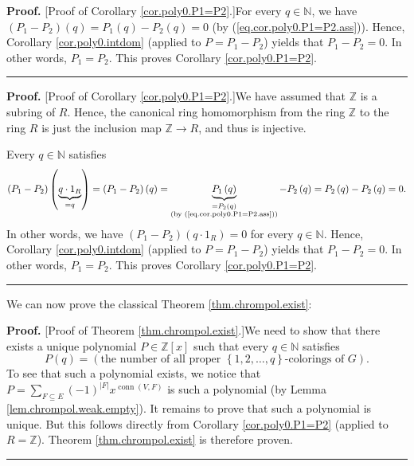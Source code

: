\documentclass[numbers=enddot,12pt,final,onecolumn,notitlepage]{scrartcl}%
\theoremstyle{definition}
\newenvironment{proof}[1][Proof]{\noindent\textbf{#1.} }{\ \rule{0.5em}{0.5em}}
\newenvironment{verlong}{}{}
\newenvironment{vershort}{}{}
\let\sumnonlimits\sum
\renewcommand{\sum}{\sumnonlimits\limits}
\begin{document}
\begin{vershort}
\begin{proof}
[Proof of Corollary \ref{cor.poly0.P1=P2}.]For every $q\in\mathbb{N}$, we have
$\left(  P_{1}-P_{2}\right)  \left(  q\right)  =P_{1}\left(  q\right)
-P_{2}\left(  q\right)  =0$ (by (\ref{eq.cor.poly0.P1=P2.ass})). Hence,
Corollary \ref{cor.poly0.intdom} (applied to $P=P_{1}-P_{2}$) yields that
$P_{1}-P_{2}=0$. In other words, $P_{1}=P_{2}$. This proves Corollary
\ref{cor.poly0.P1=P2}.
\end{proof}
\end{vershort}

\begin{verlong}
\begin{proof}
[Proof of Corollary \ref{cor.poly0.P1=P2}.]We have assumed that $\mathbb{Z}$
is a subring of $R$. Hence, the canonical ring homomorphism from the ring
$\mathbb{Z}$ to the ring $R$ is just the inclusion map $\mathbb{Z}\rightarrow
R$, and thus is injective.

Every $q\in\mathbb{N}$ satisfies
\[
\left(  P_{1}-P_{2}\right)  \left(  \underbrace{q\cdot1_{R}}_{=q}\right)
=\left(  P_{1}-P_{2}\right)  \left(  q\right)  =\underbrace{P_{1}\left(
q\right)  }_{\substack{=P_{2}\left(  q\right)  \\\text{(by
(\ref{eq.cor.poly0.P1=P2.ass}))}}}-P_{2}\left(  q\right)  =P_{2}\left(
q\right)  -P_{2}\left(  q\right)  =0.
\]
In other words, we have $\left(  P_{1}-P_{2}\right)  \left(  q\cdot
1_{R}\right)  =0$ for every $q\in\mathbb{N}$. Hence, Corollary
\ref{cor.poly0.intdom} (applied to $P=P_{1}-P_{2}$) yields that $P_{1}%
-P_{2}=0$. In other words, $P_{1}=P_{2}$. This proves Corollary
\ref{cor.poly0.P1=P2}.
\end{proof}
\end{verlong}

We can now prove the classical Theorem \ref{thm.chrompol.exist}:

\begin{vershort}
\begin{proof}
[Proof of Theorem \ref{thm.chrompol.exist}.]We need to show that there exists
a unique polynomial $P\in\mathbb{Z}\left[  x\right]  $ such that every
$q\in\mathbb{N}$ satisfies%
\[
P\left(  q\right)  =\left(  \text{the number of all proper }\left\{
1,2,\ldots,q\right\}  \text{-colorings of }G\right)  .
\]
To see that such a polynomial exists, we notice that $P=\sum_{F\subseteq
E}\left(  -1\right)  ^{\left\vert F\right\vert }x^{\operatorname*{conn}\left(
V,F\right)  }$ is such a polynomial (by Lemma \ref{lem.chrompol.weak.empty}).
It remains to prove that such a polynomial is unique. But this follows
directly from Corollary \ref{cor.poly0.P1=P2} (applied to $R=\mathbb{Z}$).
Theorem \ref{thm.chrompol.exist} is therefore proven.
\end{proof}
\end{vershort}
\end{document}
